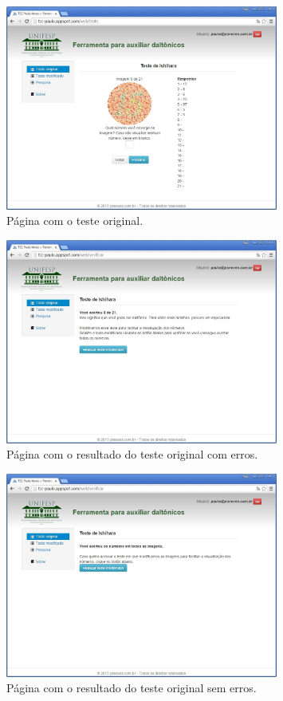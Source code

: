 \documentclass[	12pt, Times, openright, twoside, a4paper, english, brazil]{abntex2}
\begin{document}
\begin{figure}[!htb]
\centering \includegraphics[width=0.8\textwidth]{telaTesteOriginal.jpg}
\caption{Página com o teste original.} \label{fig:telaTesteOriginal}
\end{figure}

\begin{figure}[!htb]
\centering \includegraphics[width=0.8\textwidth]{telaResultadoOriginalErro.jpg}
\caption{Página com o resultado do teste original com erros.} \label{fig:telaResultadoOriginalErro}
\end{figure}

\begin{figure}[!htb]
\centering \includegraphics[width=0.8\textwidth]{telaResultadoOriginal.jpg}
\caption{Página com o resultado do teste original sem erros.} \label{fig:telaResultadoOriginal}
\end{figure}
\end{document}
